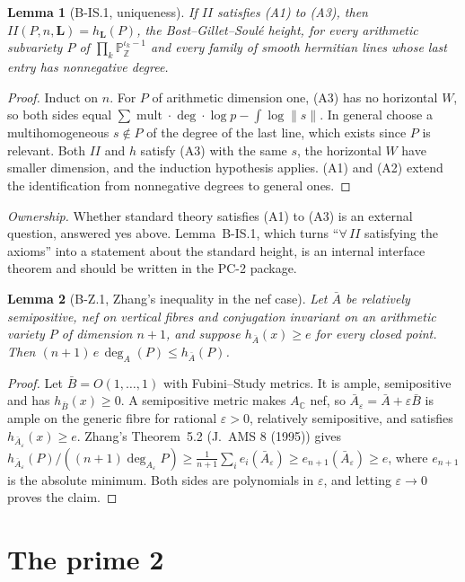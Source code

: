 \documentclass[11pt]{article}
\newtheorem{lemma}{Lemma}
\theoremstyle{definition}
\begin{document}
\begin{lemma}[B-IS.1, uniqueness]
If $II$ satisfies (A1) to (A3), then $II(P,n,\mathbf L)=h_{\mathbf L}(P)$, the Bost--Gillet--Soulé height, for every arithmetic subvariety $P$ of $\prod_k\mathbb P^{\iota_k-1}_{\mathbb Z}$ and every family of smooth hermitian lines whose last entry has nonnegative degree.
\end{lemma}
\begin{proof}
Induct on $n$. For $P$ of arithmetic dimension one, (A3) has no horizontal $W$, so both sides equal $\sum\operatorname{mult}\cdot\deg\cdot\log p-\int\log\lVert s\rVert$. In general choose a multihomogeneous $s\notin P$ of the degree of the last line, which exists since $P$ is relevant. Both $II$ and $h$ satisfy (A3) with the same $s$, the horizontal $W$ have smaller dimension, and the induction hypothesis applies. (A1) and (A2) extend the identification from nonnegative degrees to general ones.
\end{proof}

\emph{Ownership.} Whether standard theory satisfies (A1) to (A3) is an external question, answered yes above. Lemma~B-IS.1, which turns ``$\forall\,II$ satisfying the axioms'' into a statement about the standard height, is an internal interface theorem and should be written in the PC-2 package.

\begin{lemma}[B-Z.1, Zhang's inequality in the nef case]
Let $\bar A$ be relatively semipositive, nef on vertical fibres and conjugation invariant on an arithmetic variety $P$ of dimension $n+1$, and suppose $h_{\bar A}(x)\ge e$ for every closed point. Then $(n+1)\,e\,\deg_A(P)\le h_{\bar A}(P)$.
\end{lemma}
\begin{proof}
Let $\bar B=O(1,\dots,1)$ with Fubini--Study metrics. It is ample, semipositive and has $h_{\bar B}(x)\ge0$. A semipositive metric makes $A_{\mathbb C}$ nef, so $\bar A_\varepsilon=\bar A+\varepsilon\bar B$ is ample on the generic fibre for rational $\varepsilon>0$, relatively semipositive, and satisfies $h_{\bar A_\varepsilon}(x)\ge e$. Zhang's Theorem~5.2 (J.\ AMS 8 (1995)) gives $h_{\bar A_\varepsilon}(P)/((n+1)\deg_{A_\varepsilon}P)\ge\frac1{n+1}\sum_ie_i(\bar A_\varepsilon)\ge e_{n+1}(\bar A_\varepsilon)\ge e$, where $e_{n+1}$ is the absolute minimum. Both sides are polynomials in $\varepsilon$, and letting $\varepsilon\to0$ proves the claim.
\end{proof}

\section{The prime 2}\label{sec:p2}
\end{document}
